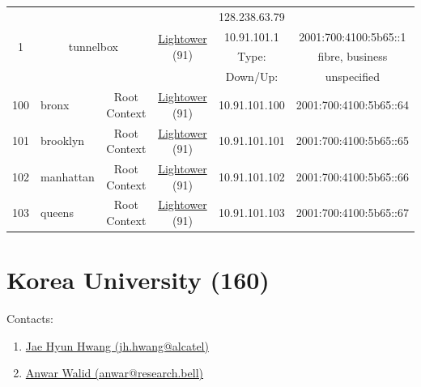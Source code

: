 \begin{small}
\begin{center}
\begin{longtable}{|c|c|c|c|c|c|c|c|}
\endhead
 \multirow{4}{*}{\tiny{1}} & \multicolumn{3}{|c|}{\multirow{4}{*}{\tiny{tunnelbox}}} & \multicolumn{2}{|c|}{\multirow{4}{*}{\tiny{\href{http://www.lightower.com}{Lightower} (91)}}} & \tiny{128.238.63.79} & \frownie{} \\* \cline{7-7}\cline{8-8}
  & \multicolumn{3}{|c|}{} & \multicolumn{2}{|c|}{} & \tiny{10.91.101.1} & \tiny{2001:700:4100:5b65::1} \\* \cline{7-7}\cline{8-8}
  & \multicolumn{3}{|c|}{} & \multicolumn{2}{|c|}{} & Type: & fibre, business \\* \cline{7-7}\cline{8-8}
  & \multicolumn{3}{|c|}{} & \multicolumn{2}{|c|}{} & Down/Up:  & unspecified \\ \hline
 \tiny{100} & \multicolumn{1}{|l|}{\tiny{bronx}} & \multicolumn{2}{|c|}{\tiny{Root Context}} & \multicolumn{2}{|c|}{\tiny{\href{http://www.lightower.com}{Lightower} (91)}} & \tiny{10.91.101.100} & \tiny{2001:700:4100:5b65::64} \\ \hline
 \tiny{101} & \multicolumn{1}{|l|}{\tiny{brooklyn}} & \multicolumn{2}{|c|}{\tiny{Root Context}} & \multicolumn{2}{|c|}{\tiny{\href{http://www.lightower.com}{Lightower} (91)}} & \tiny{10.91.101.101} & \tiny{2001:700:4100:5b65::65} \\ \hline
 \tiny{102} & \multicolumn{1}{|l|}{\tiny{manhattan}} & \multicolumn{2}{|c|}{\tiny{Root Context}} & \multicolumn{2}{|c|}{\tiny{\href{http://www.lightower.com}{Lightower} (91)}} & \tiny{10.91.101.102} & \tiny{2001:700:4100:5b65::66} \\ \hline
 \tiny{103} & \multicolumn{1}{|l|}{\tiny{queens}} & \multicolumn{2}{|c|}{\tiny{Root Context}} & \multicolumn{2}{|c|}{\tiny{\href{http://www.lightower.com}{Lightower} (91)}} & \tiny{10.91.101.103} & \tiny{2001:700:4100:5b65::67} \\ \hline
\end{longtable}
\end{center}
\end{small}



\section{Korea University (160)}
\label{sec:KRU}

Contacts:\begin{enumerate}
 \item {}\href{mailto:jh.hwang@alcatel}{Jae Hyun Hwang (jh.hwang@alcatel)}
 \item {}\href{mailto:anwar@research.bell}{Anwar Walid (anwar@research.bell)}
\end{enumerate}

